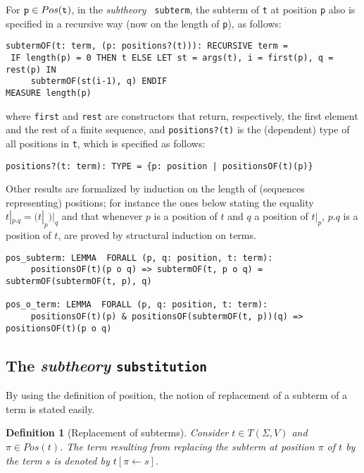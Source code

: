 \documentclass[submission,copyright,creativecommons]{eptcs}
\newtheorem{definition}{Definition}
\begin{document}
  For ${\tt p} \in Pos({\tt t})$, in the \emph{subtheory} {\tt
    subterm}, the subterm of {\tt t} at position {\tt p} also is
  specified in a recursive way (now on the length of {\tt p}), as
  follows:

  {\small
\begin{verbatim}
subtermOF(t: term, (p: positions?(t))): RECURSIVE term =
 IF length(p) = 0 THEN t ELSE LET st = args(t), i = first(p), q = rest(p) IN
     subtermOF(st(i-1), q) ENDIF
MEASURE length(p)
\end{verbatim}}

    \noindent where {\tt first} and {\tt rest} are constructors that
    return, respectively, the first element and the rest of a finite
    sequence, and {\tt positions?(t)} is the (dependent) type of all
    positions in {\tt t}, which is specified as follows:

    {\small
\begin{verbatim}
positions?(t: term): TYPE = {p: position | positionsOF(t)(p)}
\end{verbatim}}

      Other results are formalized
      by induction on the length of (sequences representing)
      positions; for instance the ones below stating the equality
      $t|_{p.q} = (t|_p)|_q$ and that whenever $p$ is a position of
      $t$ and $q$ a position of $t|_p$, $p.q$ is a position of $t$,
      are proved by structural induction on terms.

      {\small
\begin{verbatim}
pos_subterm: LEMMA  FORALL (p, q: position, t: term):
     positionsOF(t)(p o q) => subtermOF(t, p o q) = subtermOF(subtermOF(t, p), q)

pos_o_term: LEMMA  FORALL (p, q: position, t: term):
     positionsOF(t)(p) & positionsOF(subtermOF(t, p))(q) => positionsOF(t)(p o q)
\end{verbatim}}

        \subsection{The \emph{subtheory} {\tt substitution} }

        By using the definition of position, the notion of replacement
        of a subterm of a term is stated easily.

\begin{definition}[Replacement of subterms]
  Consider $t\in T(\Sigma,V)$ and $\pi \in Pos(t)$. The term resulting
  from replacing the subterm at position $\pi$ of $t$ by the term $s$
  is denoted by $t[\pi \leftarrow s]$.
\end{definition}
\end{document}
